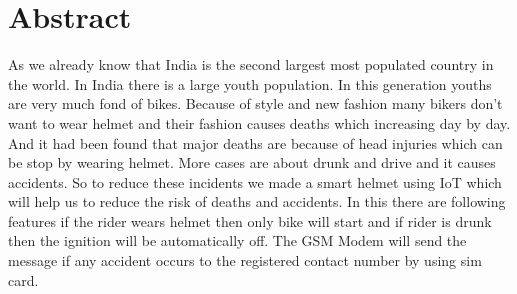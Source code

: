 \chapter*{Abstract}
As we already know that India is the second largest most populated country in the world. In India
there is a large youth population. In this generation youths are very much fond of bikes. Because of
style and new fashion many bikers don’t want to wear helmet and their fashion causes deaths which
increasing day by day. And it had been found that major deaths are because of head injuries which can
be stop by wearing helmet. More cases are about drunk and drive and it causes accidents. So to reduce
these incidents we made a smart helmet using IoT which will help us to reduce the risk of deaths and
accidents. In this there are following features if the rider wears helmet then only bike will start and if
rider is drunk then the ignition will be automatically off. The GSM Modem will send the message if any
accident occurs to the registered contact number by using sim card.